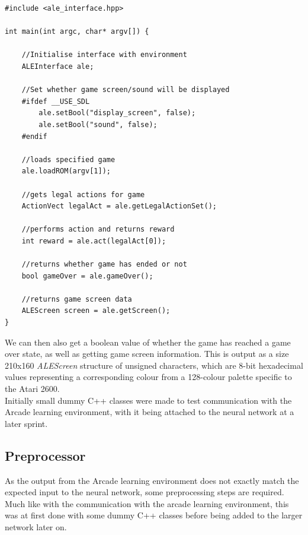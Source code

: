 \documentclass[10pt]{article}
\begin{document}
		\renewcommand{\lstlistingname}{Code Listing}
		\begin{lstlisting}[caption={ALEInterface in C++},label={ALEIO}]	
#include <ale_interface.hpp>

int main(int argc, char* argv[]) {

	//Initialise interface with environment
	ALEInterface ale;
	
	//Set whether game screen/sound will be displayed
	#ifdef __USE_SDL
		ale.setBool("display_screen", false);
		ale.setBool("sound", false);
	#endif

	//loads specified game 
	ale.loadROM(argv[1]); 

	//gets legal actions for game
	ActionVect legalAct = ale.getLegalActionSet();

	//performs action and returns reward
	int reward = ale.act(legalAct[0]);
	
	//returns whether game has ended or not
	bool gameOver = ale.gameOver();

	//returns game screen data
	ALEScreen screen = ale.getScreen();	
}

		\end{lstlisting}
			
		We can then also get a boolean value of whether the game has reached a game over state, as well as getting game screen information. This is output as a size 210x160 \textit{ALEScreen} structure of unsigned characters, which are 8-bit hexadecimal values representing a corresponding colour from a 128-colour palette specific to the Atari 2600.\\
		
		Initially small dummy C++ classes were made to test communication with the Arcade learning environment, with it being attached to the neural network at a later sprint.
	\medskip
	
	\subsection{Preprocessor}
	
	As the output from the Arcade learning environment does not exactly match the expected input to the neural network, some preprocessing steps are required. Much like with the communication with the arcade learning environment, this was at first done with some dummy C++ classes before being added to the larger network later on.\\
	
\end{document}
